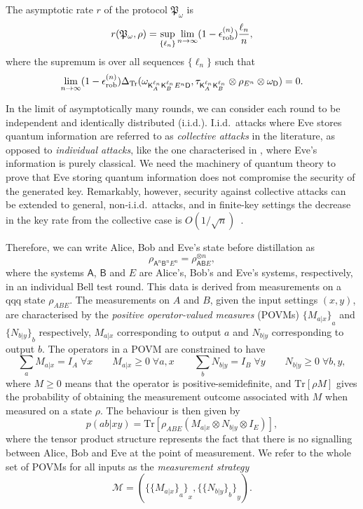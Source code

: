 \documentclass[10pt, a4paper]{article}
\numberwithin{equation}{section} %
\theoremstyle{definition}
\theoremstyle{plain}
\newcommand{\?}{\mathrel{?}} %
\newcommand{\Tr}{\mathrm{Tr}} %
\newcommand{\sM}{\mathcal{M}}
\newcommand{\crv}[1]{\mathsf{#1}}
\newcommand{\rob}{\rm rob}
\newcommand{\erob}[1]{\epsilon_{\rob}^{(#1)}}
\begin{document}
    The asymptotic rate \(r\) of the protocol \(\mathfrak{P}_{\omega}\) is~\cite{CQKeyDistill}
    \begin{equation}
      r(\mathfrak{P}_{\omega}, \rho) = \sup_{\{\ell_n\}} \lim_{n\to\infty} (1-\erob{n}) \frac{\ell_n}{n},
    \end{equation}
    where the supremum is over all sequences \(\{\ell_n\}\) such that
    \[ \lim_{n\to\infty} (1-\erob{n})\Delta_{\Tr}(\omega_{\crv{K}_{A}^{\ell_n} \crv{K}_{B}^{\ell_n} E^n \crv{D}}, \tau_{\crv{K}_{A}^{\ell_n} \crv{K}_{B}^{\ell_n}} \otimes \rho_{E^n} \otimes \omega_{\crv{D}}) = 0. \]

    In the limit of asymptotically many rounds, we can consider each round to be independent and identically distributed (i.i.d.). I.i.d.\ attacks where Eve stores quantum information are referred to as \emph{collective attacks} in the literature, as opposed to \emph{individual attacks}, like the one characterised in , where Eve's information is purely classical. We need the machinery of quantum theory to prove that Eve storing quantum information does not compromise the security of the generated key. Remarkably, however, security against collective attacks can be extended to general, non-i.i.d.\ attacks, and in finite-key settings the decrease in the key rate from the collective case is \(O(1/\sqrt{n})\)~\cite{DI_Proofs, DIQKD_PracticalEAT}.

    Therefore, we can write Alice, Bob and Eve's state before distillation as
    \[ \rho_{\crv{A}^n \crv{B}^n E^n} = \rho_{\crv{A}\crv{B}E}^{\otimes n}, \]
    where the systems \(\crv{A}\), \(\crv{B}\) and \(E\) are Alice's, Bob's and Eve's systems, respectively, in an individual Bell test round. This data is derived from measurements on a qqq state \(\rho_{A B E}\). The measurements on \(A\) and \(B\), given the input settings \((x,y)\), are characterised by the \emph{positive operator-valued measures} (POVMs)  \({\{M_{a|x}\}}_{a}\) and \({\{N_{b|y}\}}_{b}\) respectively, \(M_{a|x}\) corresponding to output \(a\) and \(N_{b|y}\) corresponding to output \(b\). The operators in a POVM are constrained to have
    \[ \sum_{a} M_{a|x} = I_{A}\;\forall x \qquad M_{a|x} \geq 0\;\forall a, x \qquad \sum_{b} N_{b|y} = I_{B}\;\forall y \qquad N_{b|y} \geq 0\;\forall b, y, \]
    where \(M \geq 0\) means that the operator is positive-semidefinite, and \(\Tr\left[\rho M\right]\) gives the probability of obtaining the measurement outcome associated with \(M\) when measured on a state \(\rho\). The behaviour is then given by
    \begin{equation}\label{eqn:probmeas}
      p(ab|xy) = \Tr\left[\rho_{A B E} \left(M_{a|x} \otimes N_{b|y} \otimes I_{E}\right) \right],
    \end{equation}
    where the tensor product structure represents the fact that there is no signalling between Alice, Bob and Eve at the point of measurement. We refer to the whole set of POVMs for all inputs as the \emph{measurement strategy}
    \[ \sM = \left({\{ {\{ M_{a|x}\}}_a \}}_x, {\{ {\{N_{b|y}\}}_b \}}_y \right). \]
\end{document}
